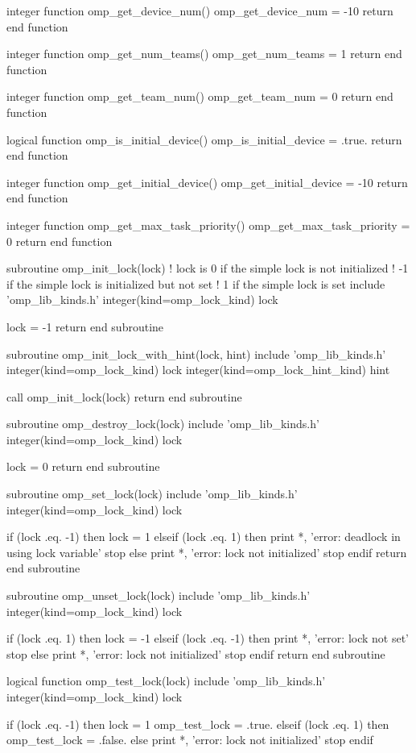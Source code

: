{\begin{ompfFunction}
integer function omp_get_device_num()
  omp_get_device_num = -10
  return
end function

integer function omp_get_num_teams()
  omp_get_num_teams = 1
  return
end function

integer function omp_get_team_num()
  omp_get_team_num = 0
  return
end function

logical function omp_is_initial_device()
  omp_is_initial_device = .true.
  return
end function

integer function omp_get_initial_device()
  omp_get_initial_device = -10
  return
end function

integer function omp_get_max_task_priority()
  omp_get_max_task_priority = 0
  return
end function

subroutine omp_init_lock(lock)
  ! lock is 0 if the simple lock is not initialized
  !        -1 if the simple lock is initialized but not set
  !         1 if the simple lock is set
  include 'omp_lib_kinds.h'
  integer(kind=omp_lock_kind) lock

  lock = -1
  return
end subroutine

subroutine omp_init_lock_with_hint(lock, hint)
  include 'omp_lib_kinds.h'
  integer(kind=omp_lock_kind) lock
  integer(kind=omp_lock_hint_kind) hint

  call omp_init_lock(lock)
  return
end subroutine

subroutine omp_destroy_lock(lock)
  include 'omp_lib_kinds.h'
  integer(kind=omp_lock_kind) lock

  lock = 0
  return
end subroutine

subroutine omp_set_lock(lock)
  include 'omp_lib_kinds.h'
  integer(kind=omp_lock_kind) lock

  if (lock .eq. -1) then
    lock = 1
  elseif (lock .eq. 1) then
    print *, 'error: deadlock in using lock variable'
    stop
  else
    print *, 'error: lock not initialized'
    stop
  endif
  return
end subroutine

subroutine omp_unset_lock(lock)
  include 'omp_lib_kinds.h'
  integer(kind=omp_lock_kind) lock

  if (lock .eq. 1) then
    lock = -1
  elseif (lock .eq. -1) then
    print *, 'error: lock not set'
    stop
  else
    print *, 'error: lock not initialized'
    stop
  endif
  return
end subroutine

logical function omp_test_lock(lock)
  include 'omp_lib_kinds.h'
  integer(kind=omp_lock_kind) lock

  if (lock .eq. -1) then
    lock = 1
    omp_test_lock = .true.
  elseif (lock .eq. 1) then
    omp_test_lock = .false.
  else
    print *, 'error: lock not initialized'
    stop
  endif


\end{ompfFunction}}
